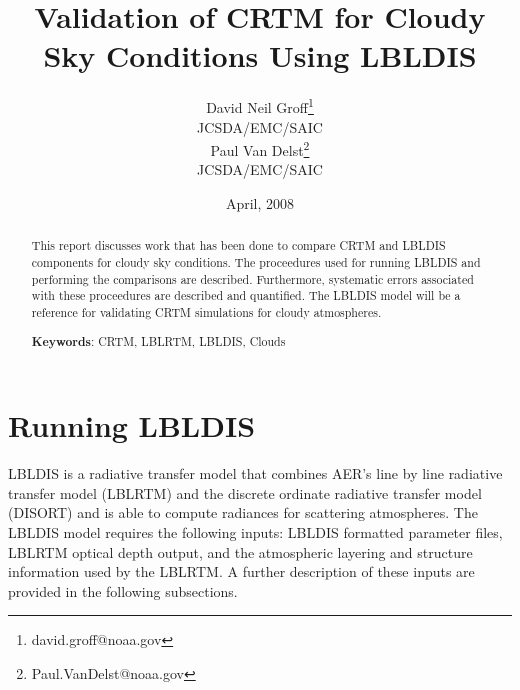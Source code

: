 





\title{Validation of CRTM for Cloudy Sky Conditions Using LBLDIS}
\author{David Neil Groff\footnote{david.groff@noaa.gov}\\JCSDA/EMC/SAIC\\[0.25in]
        Paul Van Delst\footnote{Paul.VanDelst@noaa.gov}\\JCSDA/EMC/SAIC\\[0.25in]}
\date{April, 2008}



\maketitle

\begin{abstract}
This report discusses work that has been done to compare CRTM and LBLDIS components for cloudy sky conditions. The proceedures used for running LBLDIS and performing the comparisons are described. Furthermore, systematic errors associated with these proceedures are described and quantified.
The LBLDIS model will be a reference for validating CRTM simulations for cloudy atmospheres. 
   
\textbf{Keywords}: CRTM, LBLRTM, LBLDIS, Clouds  
\end{abstract}




\section{Running LBLDIS}
LBLDIS is a radiative transfer model that combines AER's line by line radiative transfer model (LBLRTM) and the discrete ordinate radiative transfer model (DISORT) and is able to compute radiances
for scattering atmospheres. The LBLDIS model requires the following inputs: LBLDIS formatted parameter files, 
LBLRTM optical depth output, and the atmospheric layering and structure information used by the 
LBLRTM. A further description of these inputs are provided in the following subsections.

